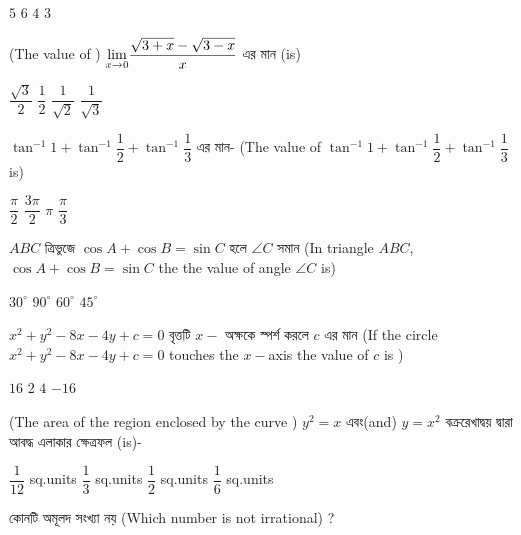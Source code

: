 \documentclass[addpoints]{exam}
\begin{document}
\begin{questions}
\begin{oneparchoices}
\choice $ 5 $
\choice $ 6 $
\choice $ 4 $
\choice $ 3 $
\end{oneparchoices}

\question (The value of ) $ \mathlarger{\lim_{x\to 0}}\dfrac{\sqrt{3+x}-\sqrt{3-x}}{x} $ এর মান (is)


\begin{oneparchoices}
\choice $ \dfrac{\sqrt{3}}{2} $
\choice $ \dfrac{1}{2} $
\choice $ \dfrac{1}{\sqrt{2}} $
\choice $ \dfrac{1}{\sqrt{3}} $
\end{oneparchoices}

\question $ \tan^{-1}1+\tan^{-1}\dfrac{1}{2}+\tan^{-1}\dfrac{1}{3} $ এর মান- (The value of $ \tan^{-1}1+\tan^{-1}\dfrac{1}{2}+\tan^{-1}\dfrac{1}{3} $ is)

\begin{oneparchoices}
\choice $ \dfrac{\pi}{2} $
\choice $ \dfrac{3\pi}{2} $
\choice $ \pi $
\choice $ \dfrac{\pi}{3} $
\end{oneparchoices}

\question $ ABC $ ত্রিভুজে $ \cos A +\cos B = \sin C $ হলে $ \angle C$ সমান (In triangle $ ABC $, $ \cos A +\cos B = \sin C $ the the value of angle $ \angle C$ is)


\begin{oneparchoices}
\choice  $ 30^{\circ} $
\choice  $ 90^{\circ} $
\choice  $ 60^{\circ} $
\choice  $ 45^{\circ} $
\end{oneparchoices}

\question  $ x^{2}+y^{2}-8x-4y+c=0 $ বৃত্তটি $ x- $ অক্ষকে স্পর্শ করলে $ c $ এর মান  (If the circle $ x^{2}+y^{2}-8x-4y+c=0 $ touches the $ x- $axis the value of $ c $ is ) 


\begin{oneparchoices}
\choice $ 16 $ 
\choice $ 2 $ 
\choice $ 4 $
\choice $ -16 $
\end{oneparchoices}

\question  (The area of the region enclosed by the curve ) $ y^{2}=x $ এবং(and) $ y=x^{2} $ বক্ররেখাদ্বয় দ্বারা আবদ্ধ এলাকার ক্ষেত্রফল (is)-

\begin{oneparchoices}
\choice $ \dfrac{1}{12} $ sq.units
\choice $ \dfrac{1}{3} $ sq.units
\choice $ \dfrac{1}{2} $ sq.units
\choice $ \dfrac{1}{6} $ sq.units
\end{oneparchoices}



\question  কোনটি অমূলদ সংখ্যা নয় (Which number is not irrational) ?


\end{questions}
\end{document}
